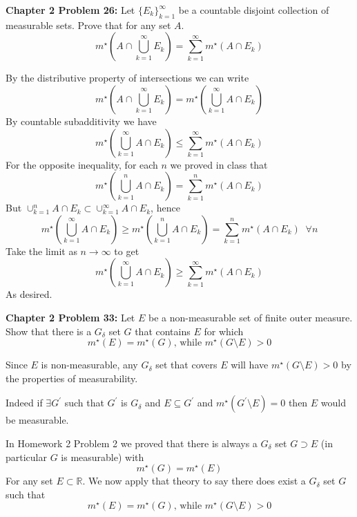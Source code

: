 \documentclass[11pt]{article}
\newcommand{\mstar}[1]{m^{\star}\left(#1\right)}
\newcommand{\pr}{^{\prime}}
\newcommand{\gdelta}{G_{\delta}}
\newcommand{\R}{\mathbb{R}}
\begin{document}
    \clearpage

    \begin{mybox}
        \textbf{Chapter 2 Problem 26:}
        Let $\{ E_k \}_{k=1}^{\infty}$ be a countable disjoint collection of measurable sets.
        Prove that for any set $A$.
        \[
            \mstar{A \cap \bigcup_{k=1}^{\infty} E_k} = \sum_{k=1}^{\infty} \mstar{A \cap E_k}
        \]
    \end{mybox}
    By the distributive property of intersections we can write
    \[
        \mstar{A \cap \bigcup_{k=1}^{\infty} E_k} = \mstar{\bigcup_{k=1}^{\infty} A \cap  E_k}
    \]
    By countable subadditivity we have
    \[
        \mstar{\bigcup_{k=1}^{\infty} A \cap E_k} \leq \sum_{k=1}^{\infty} \mstar{A \cap E_k}
    \]
    For the opposite inequality, for each $n$ we proved in class that
    \[
        \mstar{\bigcup_{k=1}^{n} A \cap E_k} = \sum_{k=1}^{n} \mstar{A \cap E_k}
    \]
    But $\cup_{k=1}^{n} A \cap E_k \subset \cup_{k=1}^{\infty} A \cap E_k$, hence
    \[
        \mstar{\bigcup_{k=1}^{\infty} A \cap E_k} \geq \mstar{\bigcup_{k=1}^{n} A \cap E_k} = \sum_{k=1}^{n} \mstar{A \cap E_k} \;\; \forall n
    \]
    Take the limit as $n \rightarrow \infty$ to get
    \[
        \mstar{\bigcup_{k=1}^{\infty} A \cap E_k} \geq \sum_{k=1}^{\infty} \mstar{A \cap E_k}
    \]
    As desired.

    \clearpage
    \begin{mybox}
        \textbf{Chapter 2 Problem 33:} Let $E$ be a non-measurable set of finite outer measure.
        Show that there is a $\gdelta$ set $G$ that contains $E$ for which
        \[
            \mstar{E} = \mstar{G} \text{, while } \mstar{G \setminus E} > 0
        \]
    \end{mybox}

    Since $E$ is non-measurable, any $\gdelta$ set that covers $E$ will have $\mstar{G \setminus E} > 0$ by the properties of measurability.

    Indeed if $\exists G\pr$ such that $G\pr$ is $\gdelta$ and $E \subseteq G\pr$ and $\mstar{G\pr \setminus E} = 0$ then $E$ would be measurable.

    In Homework 2 Problem 2 we proved that there is always a $G_\delta$ set $G \supset E$ (in particular $G$ is measurable) with
    \[
        \mstar{G} = \mstar{E}
    \]
    For any set $E \subset \R$.
    We now apply that theory to say there does exist a $\gdelta$ set $G$ such that
    \[
        \mstar{E} = \mstar{G} \text{, while } \mstar{G \setminus E} > 0
    \]
\end{document}
